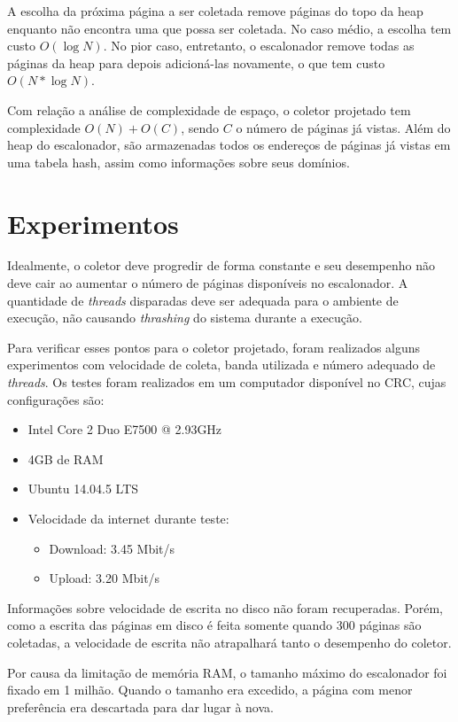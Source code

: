 \documentclass[paper=a4, fontsize=11pt]{scrartcl}
\numberwithin{equation}{section}		%
\numberwithin{figure}{section}			%
\numberwithin{table}{section}				%
\begin{document}
A escolha da próxima página a ser coletada remove páginas do topo da heap enquanto não encontra uma que possa ser coletada. No caso médio, a escolha tem custo $O(\log N)$. No pior caso, entretanto, o escalonador remove todas as páginas da heap para depois adicioná-las novamente, o que tem custo $O(N * \log N)$.

Com relação a análise de complexidade de espaço, o coletor projetado tem complexidade $O(N) + O(C)$, sendo $C$ o número de páginas já vistas. Além do heap do escalonador, são armazenadas todos os endereços de páginas já vistas em uma tabela hash, assim como informações sobre seus domínios.

\section{Experimentos}
Idealmente, o coletor deve progredir de forma constante e seu desempenho não deve cair ao aumentar o número de páginas disponíveis no escalonador. A quantidade de \textit{threads} disparadas deve ser adequada para o ambiente de execução, não causando \textit{thrashing} do sistema durante a execução. 

Para verificar esses pontos para o coletor projetado, foram realizados alguns experimentos com velocidade de coleta, banda utilizada e número adequado de \textit{threads}. Os testes foram realizados em um computador disponível no CRC, cujas configurações são:
\begin{itemize}
	\item Intel Core 2 Duo E7500 @ 2.93GHz
	\item 4GB de RAM
	\item Ubuntu 14.04.5 LTS
	\item Velocidade da internet durante teste:
		\begin{itemize}
			\item Download: 3.45 Mbit/s
			\item Upload: 3.20 Mbit/s
		\end{itemize}
\end{itemize}

Informações sobre velocidade de escrita no disco não foram recuperadas. Porém, como a escrita das páginas em disco é feita somente quando 300 páginas são coletadas, a velocidade de escrita não atrapalhará tanto o desempenho do coletor.

Por causa da limitação de memória RAM, o tamanho máximo do escalonador foi fixado em 1 milhão. Quando o tamanho era excedido, a página com menor preferência era descartada para dar lugar à nova. 
\end{document}
